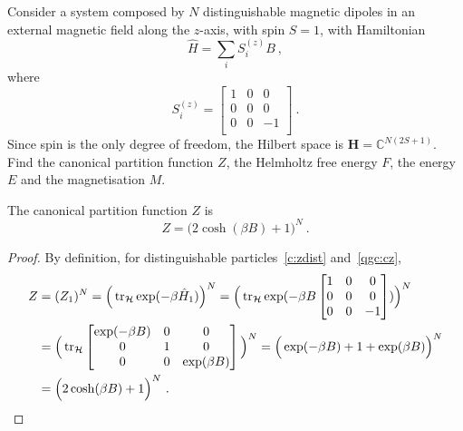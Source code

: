     \begin{exercise}
        Consider a system composed by $N$ distinguishable magnetic dipoles in an external magnetic field along the $z$-axis, with spin $S = 1$, with Hamiltonian 
        \begin{equation*}
            \hat H = \sum_i S^{(z)}_i B ~,
        \end{equation*}
        where
        \begin{equation*}
            S^{(z)}_i = \begin{bmatrix}
                1 & 0 & 0 \\
                0 & 0 & 0 \\
                0 & 0 & - 1 \\
            \end{bmatrix} ~.
        \end{equation*}
        Since spin is the only degree of freedom, the Hilbert space is $\mathbf H = \mathbb C^{N (2S + 1)}$. Find the canonical partition function $Z$, the Helmholtz free energy $F$, the energy $E$ and the magnetisation $M$.
    \end{exercise}

    The canonical partition function $Z$ is 
    \begin{equation*}
        Z = \Big ( 2 \cosh (\beta B) + 1 \Big)^N ~.
    \end{equation*}
    \begin{proof}
        By definition, for distinguishable particles~\eqref{c:zdist} and~\eqref{qgc:cz},
        \begin{equation*}
        \begin{aligned}
            Z & = (Z_1)^N = \Big (\operatorname{tr}_{\mathcal H} \exp(- \beta \hat H_1) \Big)^N = \Big (\operatorname{tr}_{\mathcal H} \exp(- \beta B \begin{bmatrix}
                1 & 0 & 0 \\ 0 & 0 & 0 \\ 0 & 0 & - 1 \\ 
            \end{bmatrix}) \Big)^N \\ & = \Big(\operatorname{tr}_{\mathcal H} \begin{bmatrix}
                \exp(- \beta B) & 0 & 0 \\ 0 & 1 & 0 \\ 0 & 0 & \exp(\beta B) \\ 
            \end{bmatrix} \Big )^N = \Big( \exp(- \beta B) + 1 + \exp(\beta B) \Big)^N \\ & = \Big ( 2 \cosh (\beta B) + 1 \Big)^N ~.
        \end{aligned}
        \end{equation*}
    \end{proof}

